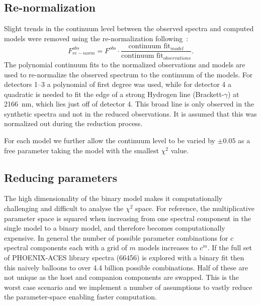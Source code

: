 \subsection{Re-normalization}
\label{subsec:renorm}
Slight trends in the continuum level between the observed spectra and computed models were removed using the re-normalization following~\citep{passegger_fundamental_2016}:
\begin{equation}
F^{obs}_{re-norm} = F^{obs} \cdot \frac{\textrm{continuum fit}_{model}}{\textrm{continuum fit}_{observations}}.
\end{equation}
The polynomial continuum fits to the normalized observations and models are used to re-normalize the observed spectrum to the continuum of the models. For detectors 1--3 a polynomial of first degree was used, while for detector 4 a quadratic is needed to fit the edge of a strong Hydrogen line (Brackett-\(\gamma\)) at 2166~nm, which lies just off of detector 4. This broad line is only observed in the synthetic spectra and not in the reduced observations. It is assumed that this was normalized out during the reduction process.

For each model we further allow the continuum level to be varied by \(\pm 0.05\) as a free parameter taking the model with the smallest \(\chi^2 \) value.


\subsection{Reducing parameters}
\label{subsec:reduce-params}
The high dimensionality of the binary model makes it computationally challenging and difficult to analyse the \(\chi^2\) space. 
For reference, the multiplicative parameter space is squared when increasing from one spectral component in the single model to a binary model, and therefore becomes computationally expensive. In general the number of possible parameter combinations for \(c\) spectral components each with a grid of \(m\) models increases to \(c^m\). If the full set of PHOENIX-ACES library spectra (66456) is explored with a binary fit then this naively balloons to over 4.4 billion possible combinations. Half of these are not unique as the host and companion components are swapped. This is the worst case scenario and we implement a number of assumptions to vastly reduce the parameter-space enabling faster computation.

